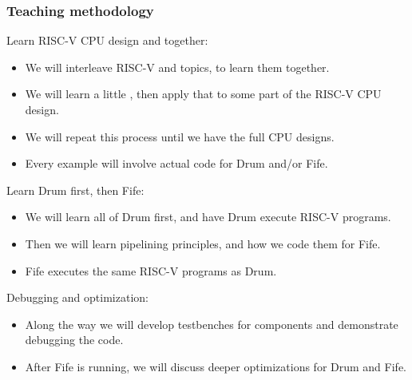 \begin{frame}
\frametitle{Teaching methodology}

\footnotesize

Learn RISC-V CPU design and {\BSV} together:

\begin{itemize}
\item We will interleave RISC-V and {\BSV} topics, to learn them together.
\item We will learn a little {\BSV}, then apply that to some part of the RISC-V CPU design.
\item We will repeat this process until we have the full CPU designs.
\item Every example will involve actual {\BSV} code for Drum and/or Fife.
\end{itemize}

\PAUSE{\vspace{1ex}}

Learn Drum first, then Fife:

\begin{itemize}
\item We will learn all of Drum first, and have Drum execute RISC-V programs.
\item Then we will learn pipelining principles, and how we code them for Fife.
\item Fife executes the same RISC-V programs as Drum.
\end{itemize}

\PAUSE{\vspace{1ex}}

Debugging and optimization:

\begin{itemize}

\item Along the way we will develop testbenches for components and
      demonstrate debugging the {\BSV} code.

\item After Fife is running, we will discuss deeper optimizations for Drum and Fife.
\end{itemize}

\end{frame}


